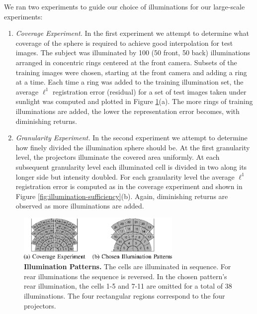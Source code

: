 \documentclass[10pt,journal,letterpaper,compsoc]{IEEEtran}
\begin{document}
We ran two experiments to guide our choice of illuminations for
our large-scale experiments:
\begin{enumerate}
\item {\em Coverage Experiment.} In the first experiment we
    attempt to determine what coverage of the sphere is
    required to achieve good interpolation for test images.
    The subject was illuminated by 100 (50 front, 50 back)
    illuminations arranged in concentric rings centered at
    the front camera.  Subsets of the training images were
    chosen, starting at the front camera and adding a ring
    at a time.  Each time a ring was added to the training
    illumination set, the average $\ell^1$ registration
    error (residual) for a set of test images taken under
    sunlight was computed and plotted in Figure
    \ref{fig:illumination-patterns}(a).  The more rings of
    training illuminations are added, the lower the
    representation error becomes, with diminishing returns.
\item {\em Granularity Experiment.} In the second
    experiment we attempt to determine how finely divided
    the illumination sphere should be.  At the first
    granularity level, the projectors  illuminate the
    covered area uniformly.  At each subsequent granularity
    level each illuminated cell is divided in two along its
    longer side but intensity doubled.  For each
    granularity level the average $\ell^1$ registration
    error is computed as in the coverage experiment and
    shown in Figure \ref{fig:illumination-sufficiency}(b).
    Again, diminishing returns are observed as more
    illuminations are added.
\end{enumerate}
\begin{figure}
\centering
\includegraphics[width=3.1in]{Figure_7}
\caption{{\bf Illumination Patterns.}   The cells are illuminated in sequence.  For rear illuminations the sequence is reversed.  In the chosen pattern's rear illumination, the cells 1-5 and 7-11 are omitted for a total of 38 illuminations. The four rectangular regions correspond to the four projectors.  }
\label{fig:illumination-patterns}
\vspace{-.75em}
\end{figure}
\end{document}
